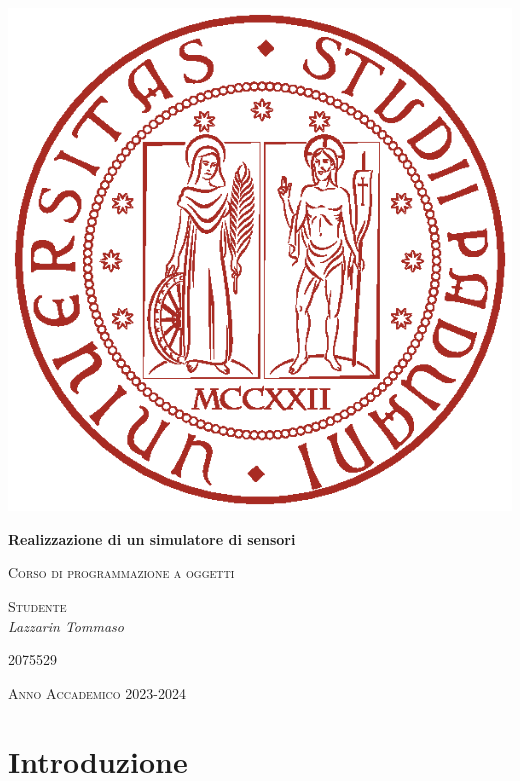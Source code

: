 \documentclass[a4paper]{article}
\begin{document}
\begin{titlepage}
    \centering
    \includegraphics{img/universita-degli-studi-di-padova.eps}
    {\huge\bfseries Realizzazione di un simulatore di sensori\par}
    \vspace{0.5cm}
	{\scshape\Large Corso di programmazione a oggetti\par}
	\vspace{1.5cm}
    {\raggedright \textsc{Studente} \\ \Large\itshape Lazzarin Tommaso\par}
    \vspace{0.1cm}
    {\raggedright\textsc{2075529}\par}
    \vfill
	{\large \textsc{Anno Accademico 2023-2024}}
\end{titlepage}
\clearpage
\tableofcontents
\clearpage
\section{Introduzione}
\end{document}

